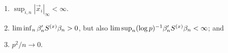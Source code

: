 \documentclass{article}
\newcounter{saveenumi}
\newcommand{\seti}{\setcounter{saveenumi}{\value{enumi}}}
\theoremstyle{remark}
\begin{document}
\begin{enumerate}
\item \label{A-boundedXes} $\sup_{i,n}|\vec{x}_{i}|_{\infty}  <\infty$.  %
\item\label{A-PSvar}  $\lim\inf_{n}\beta_{n }'S^{(x)}\beta_{n } >0$,  but also $\lim\sup_{n} (\log p)^{-1}\beta_{n }'S^{(x)}\beta_{n }  < \infty$; and
\item \label{A-rates} $p^{2}/n \rightarrow 0$.
%
\seti
\end{enumerate}
\end{document}
